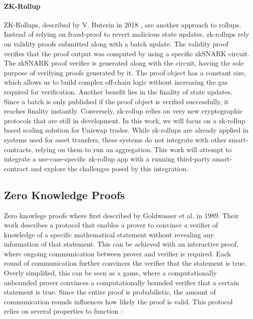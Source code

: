 \documentclass[../../thesis.tex]{subfiles}
\begin{document}
\paragraph{ZK-Rollup}
ZK-Rollups, described by V. Buterin in 2018 \cite{vbuterin2018zkrollup}, are another approach to rollups. Instead of relying on fraud-proof to revert malicious state updates, zk-rollups rely on validity proofs submitted along with a batch update. The validity proof verifies that the proof output was computed by using a specific zkSNARK circuit. The zkSNARK proof verifier is generated along with the circuit, having the sole purpose of verifying proofs generated by it. The proof object has a constant size, which allows us to build complex off-chain logic without increasing the gas required for verification. Another benefit lies in the finality of state updates. Since a batch is only published if the proof object is verified successfully, it reaches finality instantly.
Conversely, zk-rollup relies on very new cryptographic protocols that are still in development. In this work, we will focus on a zk-rollup based scaling solution for Uniswap trades. While zk-rollups are already applied in systems used for asset transfers, these systems do not integrate with other smart-contracts, relying on them to run an aggregation. This work will attempt to integrate a use-case-specific zk-rollup app with a running third-party smart-contract and explore the challenges posed by this integration. 


\subsection{Zero Knowledge Proofs}
Zero knowlege proofs where first described by Goldwasser et al. \cite{goldwasser1989knowledge} in 1989. Their work describes a protocol that enables a prover to convince a verifier of knowledge of a specific mathematical statement without revealing any information of that statement. This can be achieved with an interactive proof, where ongoing communication between prover and verifier is required. Each round of communication further convinces the verifier that the statement is true. Overly simplified, this can be seen as a game, where a computationally unbounded prover convinces a computationally bounded verifier that a certain statement is true. Since the entire proof is probabilistic, the amount of communication rounds influences how likely the proof is valid. This protocol relies on several properties to function \cite{goldreich1994definitions}:
\end{document}
